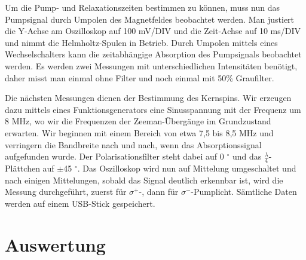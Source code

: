 \documentclass[bigchapter,colorback,accentcolor=tud4b,linedtoc,11pt]{tudreport}
\begin{document}
Um die Pump- und Relaxationszeiten bestimmen zu können, muss nun das Pumpsignal durch Umpolen des Magnetfeldes beobachtet werden. Man justiert die Y-Achse am Oszilloskop auf 100 mV/DIV und die Zeit-Achse auf 10 ms/DIV und nimmt die Helmholtz-Spulen in Betrieb. Durch Umpolen mittels eines Wechselschalters kann die zeitabhängige Absorption des Pumpsignals beobachtet werden. Es werden zwei Messungen mit unterschiedlichen Intensitäten benötigt, daher misst man einmal ohne Filter und noch einmal mit 50\% Graufilter. 

Die nächsten Messungen dienen der Bestimmung des Kernspins. Wir erzeugen dazu mittels eines Funktionsgenerators eine Sinusspannung mit der Frequenz um 8 MHz, wo wir die Frequenzen der Zeeman-Übergänge im Grundzustand erwarten. Wir beginnen mit einem Bereich von etwa 7,5 bis 8,5 MHz und verringern die Bandbreite nach und nach, wenn das Absorptionssignal aufgefunden wurde. Der Polarisationsfilter steht dabei auf 0 $^{\circ}$ und das $\frac{\lambda}{4}$-Plättchen auf $\pm$45 $^{\circ}$. Das Oszilloskop wird nun auf Mittelung umgeschaltet und nach einigen Mittelungen, sobald das Signal deutlich erkennbar ist, wird die Messung durchgeführt, zuerst für $\sigma^+$-, dann für $\sigma^-$-Pumplicht. Sämtliche Daten werden auf einem USB-Stick gespeichert.

\chapter{Auswertung}
\end{document}
